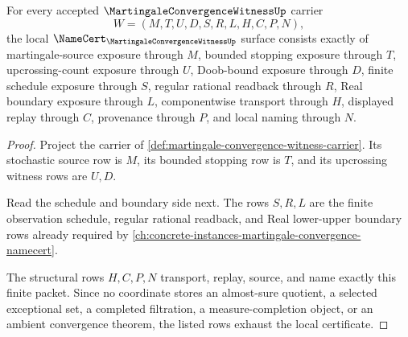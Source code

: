 \begin{theorem}
\label{thm:martingale-convergence-witness-namecert-obligations}
For every accepted $\MartingaleConvergenceWitnessUp$ carrier
$$
W=(M,T,U,D,S,R,L,H,C,P,N),
$$
the local $\NameCert_{\MartingaleConvergenceWitnessUp}$ surface consists exactly of martingale-source exposure through $M$, bounded stopping exposure through $T$, upcrossing-count exposure through $U$, Doob-bound exposure through $D$, finite schedule exposure through $S$, regular rational readback through $R$, Real boundary exposure through $L$, componentwise transport through $H$, displayed replay through $C$, provenance through $P$, and local naming through $N$.
\end{theorem}
\begin{proof}
Project the carrier of \autoref{def:martingale-convergence-witness-carrier}. Its stochastic source row is $M$, its bounded stopping row is $T$, and its upcrossing witness rows are $U,D$.

Read the schedule and boundary side next. The rows $S,R,L$ are the finite observation schedule, regular rational readback, and Real lower-upper boundary rows already required by \autoref{ch:concrete-instances-martingale-convergence-namecert}.

The structural rows $H,C,P,N$ transport, replay, source, and name exactly this finite packet. Since no coordinate stores an almost-sure quotient, a selected exceptional set, a completed filtration, a measure-completion object, or an ambient convergence theorem, the listed rows exhaust the local certificate.
\end{proof}

